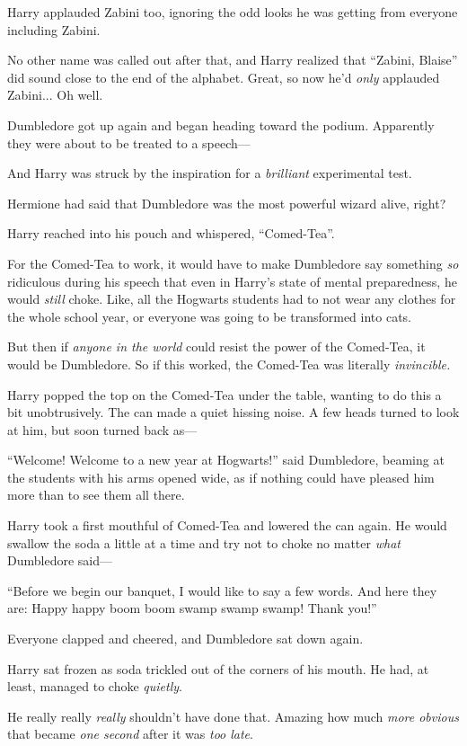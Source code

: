 Harry applauded Zabini too, ignoring the odd looks he was getting from everyone including Zabini.

No other name was called out after that, and Harry realized that “Zabini, Blaise” did sound close to the end of the alphabet. Great, so now he’d \emph{only} applauded Zabini... Oh well.

Dumbledore got up again and began heading toward the podium. Apparently they were about to be treated to a speech—

And Harry was struck by the inspiration for a \emph{brilliant} experimental test.

Hermione had said that Dumbledore was the most powerful wizard alive, right?

Harry reached into his pouch and whispered, “Comed-Tea”.

For the Comed-Tea to work, it would have to make Dumbledore say something \emph{so} ridiculous during his speech that even in Harry’s state of mental preparedness, he would \emph{still} choke. Like, all the Hogwarts students had to not wear any clothes for the whole school year, or everyone was going to be transformed into cats.

But then if \emph{anyone in the world} could resist the power of the Comed-Tea, it would be Dumbledore. So if this worked, the Comed-Tea was literally \emph{invincible.}

Harry popped the top on the Comed-Tea under the table, wanting to do this a bit unobtrusively. The can made a quiet hissing noise. A few heads turned to look at him, but soon turned back as—

“Welcome! Welcome to a new year at Hogwarts!” said Dumbledore, beaming at the students with his arms opened wide, as if nothing could have pleased him more than to see them all there.

Harry took a first mouthful of Comed-Tea and lowered the can again. He would swallow the soda a little at a time and try not to choke no matter \emph{what} Dumbledore said—

“Before we begin our banquet, I would like to say a few words. And here they are: Happy happy boom boom swamp swamp swamp! Thank you!”

Everyone clapped and cheered, and Dumbledore sat down again.

Harry sat frozen as soda trickled out of the corners of his mouth. He had, at least, managed to choke \emph{quietly}.

He really really \emph{really} shouldn’t have done that. Amazing how much \emph{more obvious} that became \emph{one second} after it was \emph{too late}.

